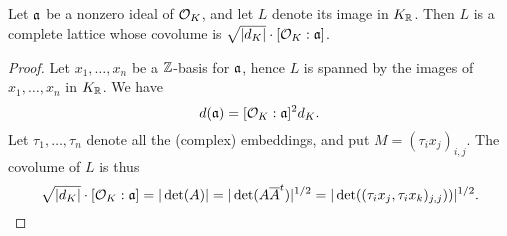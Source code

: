 \begin{proposition}\label{proposition:covolume_ideal_computation}
  Let $\mathfrak{a}$ be a nonzero ideal of $\mathcal{O}_{K}$, and let $L$ denote its image in $K_{\mathbb{R}}$.
  Then $L$ is a complete lattice whose covolume is $\sqrt{|d_{K}|} \cdot [\mathcal{O}_{K}:\mathfrak{a}]$.
\end{proposition}
\begin{proof}
  Let $x_{1},\ldots,x_{n}$ be a $\mathbb{Z}$-basis for $\mathfrak{a}$, hence $L$ is spanned by the images of $x_{1},\ldots,x_{n}$ in $K_{\mathbb{R}}$.
  We have
  \[ d(\mathfrak{a}) = [\mathcal{O}_{K}:\mathfrak{a}]^{2} d_{K}. \]
  Let $\tau_{1},\ldots,\tau_{n}$ denote all the (complex) embeddings, and put $M = (\tau_{i} x_{j})_{i,j}$.
  The covolume of $L$ is thus
  \[ \sqrt{|d_{K}|} \cdot [\mathcal{O}_{K}:\mathfrak{a}] = |\det(A)| = |\det(A \overline A^{t})|^{1/2} = |\det((\tau_{i}x_{j},\tau_{i}x_{k})_{j,j}))|^{1/2}. \]
\end{proof}

